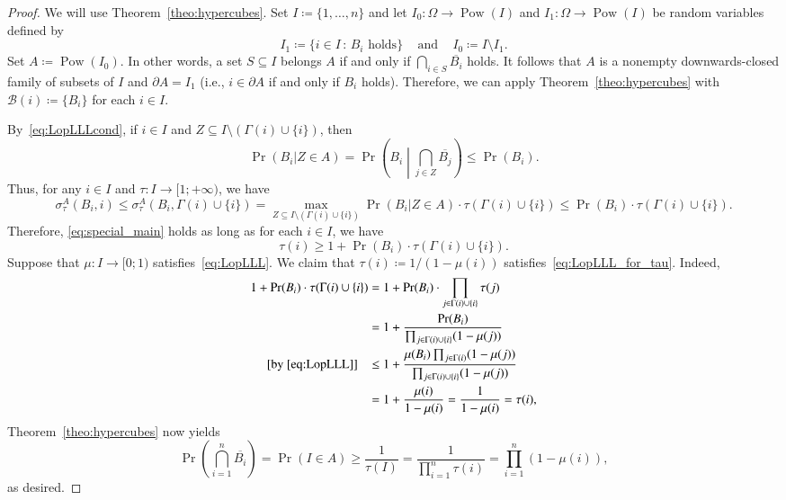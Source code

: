 \documentclass[10pt]{article}
\numberwithin{equation}{subsection}
\theoremstyle{definition}
\newcommand{\powerset}[1]{\operatorname{Pow}(#1)}
\begin{document}
	\begin{proof}
		We will use Theorem~\ref{theo:hypercubes}. Set $I \coloneqq \{1, \ldots, n\}$ and let $I_0 \colon \Omega \to \powerset{I}$ and $I_1 \colon \Omega \to \powerset{I}$ be random variables defined by
		$$
		I_1 \coloneqq \{i \in I\,:\, B_i \text{ holds}\} \;\;\;\text{ and }\;\;\; I_0 \coloneqq I \setminus I_1.
		$$
		Set $A \coloneqq \powerset{I_0}$. In other words, a set $S\subseteq I$ belongs $A$ if and only if $\bigcap_{i \in S} \overline{B_i}$ holds.  It follows that $A$ is a nonempty downwards-closed family of subsets of $I$ and $\partial A = I_1$ (i.e., $i \in \partial A$ if and only if $B_i$ holds). Therefore, we can apply Theorem~\ref{theo:hypercubes} with $\mathcal{B}(i) \coloneqq \{B_i\}$ for each $i \in I$.
		
		By~\eqref{eq:LopLLLcond}, if $i \in I$ and $Z \subseteq I \setminus (\Gamma(i)\cup \{i\})$, then
		$$
		\Pr(B_i \vert Z \in A) = \Pr\left(B_i\middle\vert \bigcap_{j \in Z} \overline{B_j}\right) \leq \Pr(B_i).
		$$
		Thus, for any $i \in I$ and $\tau \colon I \to [1;+\infty)$, we have
		$$
		\sigma^A_\tau(B_i, i) \leq \sigma^A_\tau(B_i, \Gamma(i) \cup \{i\}) = \max_{Z \subseteq I \setminus (\Gamma(i) \cup \{i\})} \Pr(B_i \vert Z \in A) \cdot \tau(\Gamma(i) \cup \{i\}) \leq \Pr(B_i) \cdot \tau(\Gamma(i) \cup \{i\}).
		$$
		Therefore, \eqref{eq:special_main} holds as long as for each $i \in I$, we have
		\begin{equation}\label{eq:LopLLL_for_tau}
		\tau(i) \geq 1 + \Pr(B_i) \cdot \tau(\Gamma(i) \cup \{i\}).
		\end{equation}
		Suppose that $\mu \colon I \to [0;1)$ satisfies~\eqref{eq:LopLLL}. We claim that $\tau(i) \coloneqq 1/(1-\mu(i))$ satisfies~\eqref{eq:LopLLL_for_tau}. Indeed,
		\begin{align*}
		1 + \Pr(B_i) \cdot \tau(\Gamma(i) \cup \{i\}) &= 1 + \Pr(B_i) \cdot \prod_{j \in \Gamma(i) \cup \{i\}} \tau(j)\\
		&= 1 + \frac{\Pr(B_i)}{\prod_{j \in \Gamma(i)\cup\{i\}} (1-\mu(j))} \\
		[\text{by~\eqref{eq:LopLLL}}]\;\;\;& \leq 1 + \frac{\mu(B_i) \prod_{j\in \Gamma(i)}(1-\mu(j))}{\prod_{j \in \Gamma(i)\cup\{i\}} (1-\mu(j))} \\
		& = 1 + \frac{\mu(i)}{1-\mu(i)} = \frac{1}{1-\mu(i)} = \tau(i),
		\end{align*}
		Theorem~\ref{theo:hypercubes} now yields
		$$
		\Pr\left(\bigcap_{i = 1}^n\overline{B_i}\right) = \Pr(I \in A) \geq \frac{1}{\tau(I)} = \frac{1}{\prod_{i = 1}^n\tau(i)}= \prod_{i = 1}^n(1 - \mu(i)),
		$$
		as desired.
	\end{proof}
	
\end{document}
